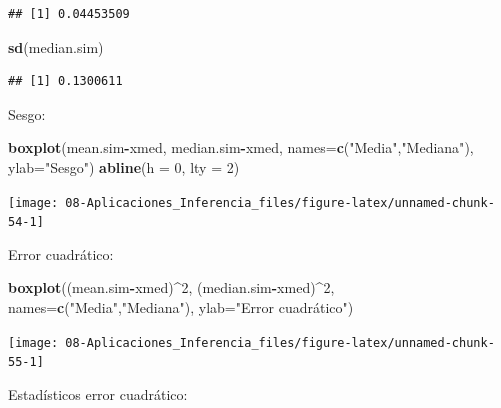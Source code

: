 \documentclass[]{book}
\newenvironment{Shaded}{\begin{snugshade}}{\end{snugshade}}
\newcommand{\KeywordTok}[1]{\textcolor[rgb]{0.13,0.29,0.53}{\textbf{#1}}}
\newcommand{\DataTypeTok}[1]{\textcolor[rgb]{0.13,0.29,0.53}{#1}}
\newcommand{\DecValTok}[1]{\textcolor[rgb]{0.00,0.00,0.81}{#1}}
\newcommand{\StringTok}[1]{\textcolor[rgb]{0.31,0.60,0.02}{#1}}
\newcommand{\OperatorTok}[1]{\textcolor[rgb]{0.81,0.36,0.00}{\textbf{#1}}}
\newcommand{\NormalTok}[1]{#1}
\theoremstyle{definition}
\theoremstyle{definition}
\theoremstyle{definition}
\theoremstyle{remark}
\begin{document}
\begin{enumerate}
\begin{verbatim}
## [1] 0.04453509
\end{verbatim}

\begin{Shaded}
\begin{Highlighting}[]
\KeywordTok{sd}\NormalTok{(median.sim)}
\end{Highlighting}
\end{Shaded}

\begin{verbatim}
## [1] 0.1300611
\end{verbatim}

  Sesgo:

\begin{Shaded}
\begin{Highlighting}[]
\KeywordTok{boxplot}\NormalTok{(mean.sim}\OperatorTok{-}\NormalTok{xmed, median.sim}\OperatorTok{-}\NormalTok{xmed, }
      \DataTypeTok{names=}\KeywordTok{c}\NormalTok{(}\StringTok{"Media"}\NormalTok{,}\StringTok{"Mediana"}\NormalTok{), }\DataTypeTok{ylab=}\StringTok{"Sesgo"}\NormalTok{)}
\KeywordTok{abline}\NormalTok{(}\DataTypeTok{h =} \DecValTok{0}\NormalTok{, }\DataTypeTok{lty =} \DecValTok{2}\NormalTok{)}
\end{Highlighting}
\end{Shaded}

  \begin{center}\texttt{[image: 08-Aplicaciones\_Inferencia\_files/figure-latex/unnamed-chunk-54-1]} \end{center}

  Error cuadrático:

\begin{Shaded}
\begin{Highlighting}[]
\KeywordTok{boxplot}\NormalTok{((mean.sim}\OperatorTok{-}\NormalTok{xmed)}\OperatorTok{^}\DecValTok{2}\NormalTok{, (median.sim}\OperatorTok{-}\NormalTok{xmed)}\OperatorTok{^}\DecValTok{2}\NormalTok{, }
      \DataTypeTok{names=}\KeywordTok{c}\NormalTok{(}\StringTok{"Media"}\NormalTok{,}\StringTok{"Mediana"}\NormalTok{), }\DataTypeTok{ylab=}\StringTok{"Error cuadrático"}\NormalTok{)}
\end{Highlighting}
\end{Shaded}

  \begin{center}\texttt{[image: 08-Aplicaciones\_Inferencia\_files/figure-latex/unnamed-chunk-55-1]} \end{center}

  Estadísticos error cuadrático:


\end{enumerate}
\end{document}
